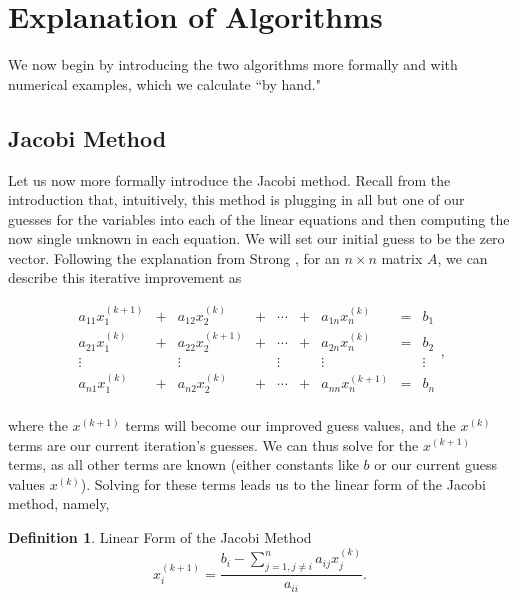 \documentclass[12pt,letterpaper]{article}
\theoremstyle{definition}
\newtheorem{defn}[thm]{Definition}
\begin{document}
\section{Explanation of Algorithms}
We now begin by introducing the two algorithms more formally and with numerical examples, which we calculate ``by hand."
\subsection{Jacobi Method}

Let us now more formally introduce the Jacobi method. Recall from the introduction that, intuitively, this method is plugging in all but one of our guesses for the variables into each of the linear equations and then computing the now single unknown in each equation. We will set our initial guess to be the zero vector. Following the explanation from Strong \cite{Strong05}, for an $n\times n$ matrix $A$, we can describe this iterative improvement as

\begin{equation}\label{jacobi_intro}
    \begin{matrix}
    a_{11}x_1^{(k+1)}&+&a_{12}x_2^{(k)}&+&\cdots&+&a_{1n}x_n^{(k)}&=&b_1\\
    a_{21}x_1^{(k)}&+&a_{22}x_2^{(k+1)}&+&\cdots&+&a_{2n}x_n^{(k)}&=&b_2\\
    \vdots &&\vdots &&\vdots &&\vdots&&\vdots\\
    a_{n1}x_1^{(k)}&+&a_{n2}x_2^{(k)}&+&\cdots&+&a_{nn}x_n^{(k+1)}&=&b_n\\
    \end{matrix},
\end{equation}

\noindent where the $x^{(k+1)}$ terms will become our improved guess values, and the $x^{(k)}$ terms are our current iteration's guesses. We can thus solve for the $x^{(k+1)}$ terms, as all other terms are known (either constants like $b$ or our current guess values $x^{(k)}$). Solving for these terms leads us to the linear form of the Jacobi method, namely,

\begin{defn}{Linear Form of the Jacobi Method}
\begin{equation*}
    x_i^{(k+1)}=\frac{b_i-\sum\limits_{j=1,j\neq i}^n a_{ij}x_j^{(k)}}{a_{ii}}.
\end{equation*}

\end{defn}
\end{document}
